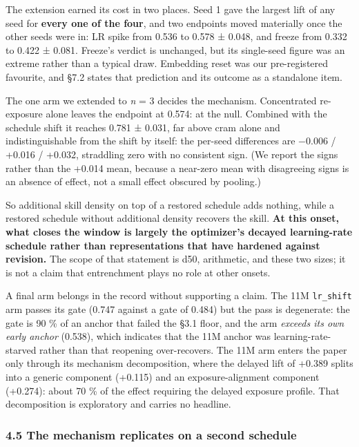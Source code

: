 \documentclass[11pt]{article}
\begin{document}
The extension earned its cost in two places. Seed 1 gave the largest lift of any seed for
\textbf{every one of the four}, and two endpoints moved materially once the other seeds were in:
LR spike from 0.536 to 0.578 ± 0.048, and freeze from 0.332 to 0.422 ± 0.081. Freeze's
verdict is unchanged, but its single-seed figure was an extreme rather than a typical draw.
Embedding reset was our pre-registered favourite, and §7.2 states that prediction and its
outcome as a standalone item.

The one arm we extended to \emph{n} = 3 decides the mechanism. Concentrated re-exposure alone
leaves the endpoint at 0.574: at the null. Combined with the schedule shift it reaches
0.781 ± 0.031, far above cram alone and indistinguishable from the shift by itself: the
per-seed differences are −0.006 / +0.016 / +0.032, straddling zero with no consistent sign.
(We report the signs rather than the +0.014 mean, because a near-zero mean with disagreeing
signs is an absence of effect, not a small effect obscured by pooling.)

So additional skill density on top of a restored schedule adds nothing, while a restored
schedule without additional density recovers the skill. \textbf{At this onset, what closes the
window is largely the optimizer's decayed learning-rate schedule rather than representations
that have hardened against revision.} The scope of that statement is d50, arithmetic, and
these two sizes; it is not a claim that entrenchment plays no role at other onsets.

A final arm belongs in the record without supporting a claim. The 11M \texttt{lr\_shift} arm passes
its gate (0.747 against a gate of 0.484) but the pass is degenerate: the gate is 90 \% of an
anchor that failed the §3.1 floor, and the arm \emph{exceeds its own early anchor} (0.538),
which indicates that the 11M anchor was learning-rate-starved rather than that reopening
over-recovers. The 11M arm enters the paper only through its mechanism decomposition, where
the delayed lift of +0.389 splits into a generic component (+0.115) and an
exposure-alignment component (+0.274): about 70 \% of the effect requiring the delayed
exposure profile. That decomposition is exploratory and carries no headline.

\subsubsection{4.5 The mechanism replicates on a second schedule}\label{the-mechanism-replicates-on-a-second-schedule}
\end{document}
